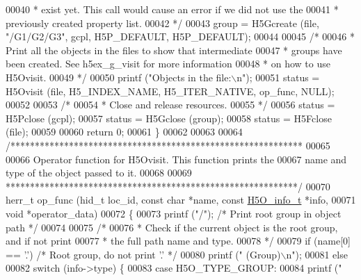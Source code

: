 \begin{DoxyCode}
00040 \textcolor{comment}{     * exist yet.  This call would cause an error if we did not use the}
00041 \textcolor{comment}{     * previously created property list.}
00042 \textcolor{comment}{     */}
00043     group = H5Gcreate (file, \textcolor{stringliteral}{"/G1/G2/G3"}, gcpl, H5P\_DEFAULT, H5P\_DEFAULT);
00044 
00045     \textcolor{comment}{/*}
00046 \textcolor{comment}{     * Print all the objects in the files to show that intermediate}
00047 \textcolor{comment}{     * groups have been created.  See h5ex\_g\_visit for more information}
00048 \textcolor{comment}{     * on how to use H5Ovisit.}
00049 \textcolor{comment}{     */}
00050     printf (\textcolor{stringliteral}{"Objects in the file:\(\backslash\)n"});
00051     status = H5Ovisit (file, H5\_INDEX\_NAME, H5\_ITER\_NATIVE, op\_func, NULL);
00052 
00053     \textcolor{comment}{/*}
00054 \textcolor{comment}{     * Close and release resources.}
00055 \textcolor{comment}{     */}
00056     status = H5Pclose (gcpl);
00057     status = H5Gclose (group);
00058     status = H5Fclose (file);
00059 
00060     \textcolor{keywordflow}{return} 0;
00061 \}
00062 
00063 
00064 \textcolor{comment}{/************************************************************}
00065 \textcolor{comment}{}
00066 \textcolor{comment}{  Operator function for H5Ovisit.  This function prints the}
00067 \textcolor{comment}{  name and type of the object passed to it.}
00068 \textcolor{comment}{}
00069 \textcolor{comment}{ ************************************************************/}
00070 herr\_t op\_func (hid\_t loc\_id, \textcolor{keyword}{const} \textcolor{keywordtype}{char} *name, \textcolor{keyword}{const} \hyperlink{struct_h5_o__info__t}{H5O\_info\_t} *info,
00071             \textcolor{keywordtype}{void} *operator\_data)
00072 \{
00073     printf (\textcolor{stringliteral}{"/"});               \textcolor{comment}{/* Print root group in object path */}
00074 
00075     \textcolor{comment}{/*}
00076 \textcolor{comment}{     * Check if the current object is the root group, and if not print}
00077 \textcolor{comment}{     * the full path name and type.}
00078 \textcolor{comment}{     */}
00079     \textcolor{keywordflow}{if} (name[0] == \textcolor{charliteral}{'.'})         \textcolor{comment}{/* Root group, do not print '.' */}
00080         printf (\textcolor{stringliteral}{"  (Group)\(\backslash\)n"});
00081     \textcolor{keywordflow}{else}
00082         \textcolor{keywordflow}{switch} (info->type) \{
00083             \textcolor{keywordflow}{case} H5O\_TYPE\_GROUP:
00084                 printf (\textcolor{stringliteral}{"%
}
\end{DoxyCode}
